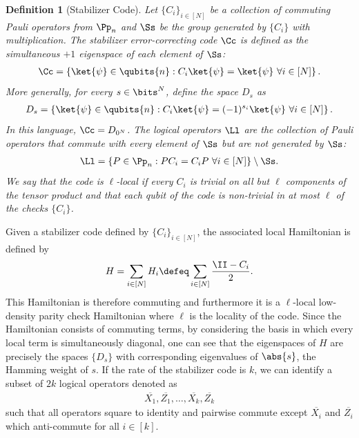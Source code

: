 \documentclass[11pt]{article}
\newtheorem{definition}[theorem]{Definition}
\begin{document}
\begin{definition}[Stabilizer Code]
Let $\{C_i\}_{i \in [N]}$ be a collection of commuting Pauli operators from $\Pp_n$ and $\Ss$ be the group generated by $\{C_i\}$ with multiplication. The stabilizer error-correcting code $\Cc$ is defined as the simultaneous $+1$ eigenspace of each element of $\Ss$: 
\begin{align}
    \Cc = \left\{ \ket{\psi} \in \qubits{n} : C_i \ket{\psi} = \ket{\psi} \ \forall i \in [N] \right\}.
\end{align}
More generally, for every $s \in \bits^N$, define the space $D_s$ as
\begin{align}
    D_s = \left\{ \ket{\psi} \in \qubits{n} : C_i \ket{\psi} = (-1)^{s_i} \ket{\psi} \ \forall i \in [N] \right\}.
\end{align}
In this language, $\Cc = D_{0^N}$. The logical operators $\Ll$ are the collection of Pauli operators that commute with every element of $\Ss$ but are not generated by $\Ss$:
\begin{align}
    \Ll = \left \{P \in \Pp_n : P C_i = C_i P \ \forall i \in [N] \right \} \setminus \Ss.
\end{align}
We say that the code is $\ell$-local if every $C_i$ is trivial on all but $\ell$ components of the tensor product and that each qubit of the code is non-trivial in at most $\ell$ of the checks $\{C_i\}$.
\end{definition}
Given a stabilizer code defined by $\{C_i\}_{i \in [N]}$, the associated local Hamiltonian is defined by
\begin{align}
    H = \sum_{i \in [N]} H_i \defeq \sum_{i \in [N]} \frac{\II - C_i}{2}.
\end{align}
This Hamiltonian is therefore commuting and furthermore it is a $\ell$-local low-density parity check Hamiltonian where $\ell$ is the locality of the code. Since the Hamiltonian consists of commuting terms, by considering the basis in which every local term is simultaneously diagonal, one can see that the eigenspaces of $H$ are precisely the spaces $\{D_s\}$ with corresponding eigenvalues of $\abs{s}$, the Hamming weight of $s$. 
If the rate of the stabilizer code is $k$, we can identify a subset of $2k$ logical operators denoted as
\begin{align}
    \overline{X_1}, \overline{Z_1}, \ldots, \overline{X_k}, \overline{Z_k}
\end{align}
such that all operators square to identity and pairwise commute except $\overline{X_i}$ and $\overline{Z_i}$ which anti-commute for all $i \in [k]$.
\end{document}
